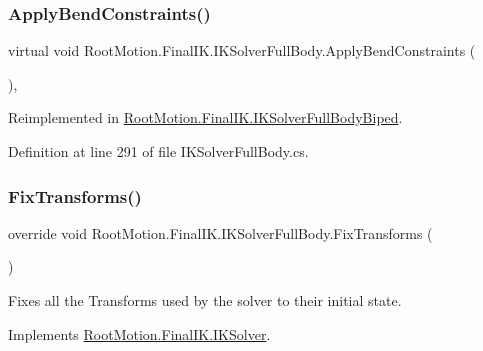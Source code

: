 \subsubsection{\texorpdfstring{Apply\+Bend\+Constraints()}{ApplyBendConstraints()}}
{\footnotesize\ttfamily virtual void Root\+Motion.\+Final\+I\+K.\+I\+K\+Solver\+Full\+Body.\+Apply\+Bend\+Constraints (\begin{DoxyParamCaption}{ }\end{DoxyParamCaption})\hspace{0.3cm}{\ttfamily [protected]}, {\ttfamily [virtual]}}



Reimplemented in \mbox{\hyperlink{class_root_motion_1_1_final_i_k_1_1_i_k_solver_full_body_biped_ad062f0934df40f03a40e79a94dc32709}{Root\+Motion.\+Final\+I\+K.\+I\+K\+Solver\+Full\+Body\+Biped}}.



Definition at line 291 of file I\+K\+Solver\+Full\+Body.\+cs.

\mbox{\label{class_root_motion_1_1_final_i_k_1_1_i_k_solver_full_body_ad2db122b4977cefd66fad54e26d38671}} 
\subsubsection{\texorpdfstring{Fix\+Transforms()}{FixTransforms()}}
{\footnotesize\ttfamily override void Root\+Motion.\+Final\+I\+K.\+I\+K\+Solver\+Full\+Body.\+Fix\+Transforms (\begin{DoxyParamCaption}{ }\end{DoxyParamCaption})\hspace{0.3cm}{\ttfamily [virtual]}}



Fixes all the Transforms used by the solver to their initial state. 



Implements \mbox{\hyperlink{class_root_motion_1_1_final_i_k_1_1_i_k_solver_a266ec32ebdd83faaf37abc41718061b7}{Root\+Motion.\+Final\+I\+K.\+I\+K\+Solver}}.



